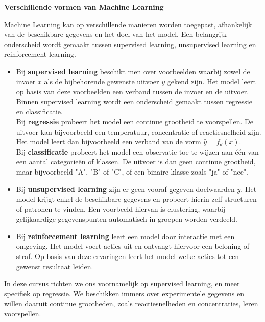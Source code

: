 \documentclass{ximera}
\begin{document}
\begin{remark} \textbf{Verschillende vormen van Machine Learning}

Machine Learning kan op verschillende manieren worden toegepast, afhankelijk van de beschikbare gegevens en het doel van het model. Een belangrijk onderscheid wordt gemaakt tussen supervised learning, unsupervised learning en reinforcement learning.

\begin{itemize}
    \item Bij \textbf{supervised learning} beschikt men over voorbeelden waarbij zowel de invoer $x$ als de bijbehorende gewenste uitvoer $y$ gekend zijn. Het model leert op basis van deze voorbeelden een verband tussen de invoer en de uitvoer.
    Binnen supervised learning wordt een onderscheid gemaakt tussen regressie en classificatie. \\
    Bij \textbf{regressie} probeert het model een continue grootheid te
    voorspellen. De uitvoer kan bijvoorbeeld een temperatuur, concentratie of reactiesnelheid zijn. Het model leert dan bijvoorbeeld een verband van de vorm $\hat{y}=f_\theta(x).$ \\
    Bij \textbf{classificatie} probeert het model een observatie toe te wijzen aan één van een aantal categorieën of klassen. De uitvoer is dan geen continue grootheid, maar bijvoorbeeld "A", "B" of "C", of een binaire klasse zoals "ja" of "nee".

    \item Bij \textbf{unsupervised learning} zijn er geen vooraf gegeven doelwaarden $y$. Het model krijgt enkel de beschikbare gegevens en probeert hierin zelf structuren of patronen te vinden. Een voorbeeld hiervan is clustering, waarbij gelijkaardige gegevenspunten automatisch in groepen worden verdeeld.

    \item Bij \textbf{reinforcement learning} leert een model door interactie met een omgeving. Het model voert acties uit en ontvangt hiervoor een beloning of straf. Op basis van deze ervaringen leert het model welke acties tot een gewenst resultaat leiden.
\end{itemize}
\end{remark}

In deze cursus richten we ons voornamelijk op supervised learning, en meer specifiek op regressie. We beschikken immers over experimentele gegevens en willen daaruit continue grootheden, zoals reactiesnelheden en
concentraties, leren voorspellen.
\end{document}
